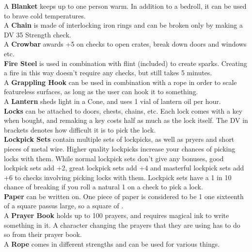 A \textbf{Blanket} keeps up to one person warm. In addition to a bedroll, it can be used to brave cold temperatures.\\

A \textbf{Chain} is made of interlocking iron rings and can be broken only by making a DV 35 Strength check.\\

A \textbf{Crowbar} awards +5 on checks to open crates, break down doors and windows etc.\\

\textbf{Fire Steel} is used in combination with flint (included) to create sparks. Creating a fire in this way doesn't require any checks, but still takes 5 minutes.\\

A \textbf{Grappling Hook} can be used in combination with a rope in order to scale featureless surfaces, as long as the user can hook it to something.\\

A \textbf{Lantern} sheds light in a  Cone, and uses 1 vial of lantern oil per hour.\\

\textbf{Locks} can be attached to doors, chests, chains, etc. Each lock comes with a key when bought, and remaking a key costs half as much as the lock itself. The DV in brackets denotes how difficult it is to pick the lock.\\

\textbf{Lockpick Sets} contain multiple sets of lockpicks, as well as pryers and short pieces of metal wire. Higher quality lockpicks increase your chances of picking locks with them. While normal lockpick sets don't give any bonuses, good lockpick sets add +2, great lockpick sets add +4 and masterful lockpick sets add +6 to checks involving picking locks with them. Lockpick sets have a 1 in 10 chance of breaking if you roll a natural 1 on a check to pick a lock.\\

\textbf{Paper} can be written on. One piece of paper is considered to be 1 one sixteenth of a square passus large, so a square of  .\\

A \textbf{Prayer Book} holds up to 100 prayers, and requires magical ink to write something in it. A character changing the prayers that they are using has to do so from their prayer book.\\

A \textbf{Rope} comes in different strengths and can be used for various things.\\

